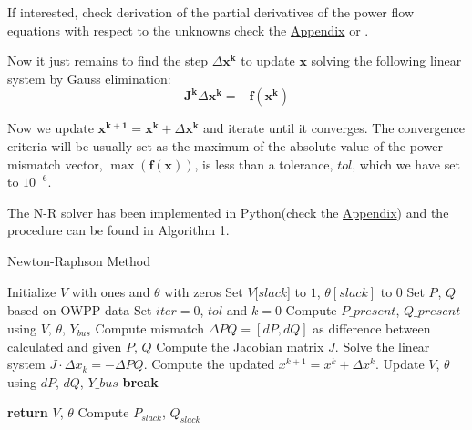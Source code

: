 \documentclass[a4paper,11pt, titlepage, twoside]{article}
\begin{document}
If interested, check derivation of the partial derivatives of the power flow equations with respect to the unknowns check the \hyperref[Appendix]{Appendix} or \cite{llibrebase}.

Now it just remains to find the step $\Delta \mathbf{x^k}$ to update $\mathbf{x}$ solving the following linear system by Gauss elimination:
\begin{equation}
    \mathbf{J^k}\Delta \mathbf{x^k} = -\mathbf{f(x^k)}
\end{equation}

Now we update $\mathbf{x^{k+1}}=\mathbf{x^{k}}+\Delta \mathbf{x^k}$ and iterate until it converges. The convergence criteria will be usually set as the maximum of the absolute value of the power mismatch vector, $\max(\mathbf{f(x)})$, is less than a tolerance, $tol$, 
which we have set to $10^{-6}$.







The N-R solver has been implemented in Python(check the \hyperref[Appendix]{Appendix}) and the procedure can be found in Algorithm 1.
\begin{algorithm}[H]
    \caption{Newton-Raphson Method}
    \begin{algorithmic}
        \State Initialize $V$ with ones and $\theta$ with zeros
        \Statex \hspace{\algorithmicindent}Set $V[slack$] to $1$, $\theta[slack]$ to $0$
        \Statex \hspace{\algorithmicindent}Set $P_{}$, $Q_{}$ based on OWPP data
        \Statex \hspace{\algorithmicindent}Set $iter = 0 $, $tol$ and $k = 0$
            \State Compute $P\_present$, $Q\_present$ using $V$, $\theta$, $Y_{bus}$
            \State Compute mismatch $\Delta PQ = [dP, dQ]$ as difference between calculated and given $P$, $Q$
            \State Compute the Jacobian matrix $J$.
            \State Solve the linear system $J \cdot \Delta x_k = -\Delta PQ$.
            \State Compute the updated $x^{k+1} = x^{k} + \Delta x^k $.
            \State Update $V$, $\theta$ using $dP$, $dQ$, $Y\_bus$
                \State \textbf{break}
            \EndIf
            
        \EndWhile
        \State \textbf{return} $V$, $\theta$
        \State Compute $P_{slack}$, $Q_{slack}$
    \EndProcedure
    \end{algorithmic}
    \end{algorithm}
\end{document}
